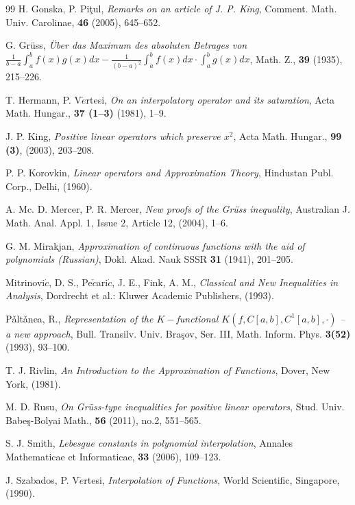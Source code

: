 \documentclass[12pt,leqno,a4paper,dvips,twoside]{article}
\begin{document}
{\begin{thebibliography}{99}
H. Gonska, P. Pi\c{t}ul, {\it Remarks on an article of J. P. King}, Comment. Math. Univ. Carolinae, \textbf{46} (2005), 645--652. 

G. Gr{\"u}ss, {\it {\"U}ber das Maximum des absoluten Betrages von $\frac{1}{b-a}\int^b_a{f(x)g(x)dx}-\frac{1}{(b-a)^2}\int^b_a{f(x)dx}\cdot\int^b_a{g(x)dx}$}, Math. Z., \textbf{39} (1935), 215--226.

T. Hermann, P. V$\acute{e}$rtesi, {\it On an interpolatory operator and its saturation}, Acta 
Math. Hungar., \textbf{37 (1--3)} (1981), 1--9.

J. P. King, {\it Positive linear operators which preserve $x^2$}, Acta Math. Hungar., \textbf{99 (3)}, (2003), 203--208. 

P. P. Korovkin, {\it Linear operators and Approximation Theory}, Hindustan Publ. Corp., Delhi, (1960).

A. Mc. D. Mercer, P. R. Mercer, {\it New proofs of the Gr\"{u}ss inequality}, Australian J. Math. Anal. Appl. 1, Issue 2, Article 12, (2004), 1--6.

G. M. Mirakjan, {\it Approximation of continuous functions with the aid of polynomials (Russian)}, Dokl. Akad. Nauk SSSR \textbf{31} (1941), 201--205.

Mitrinovi$\acute{c}$, D. S., Pe$\check{c}$ari$\acute{c}$, J. E., Fink, A. M., {\it Classical and New Inequalities in Analysis}, Dordrecht et al.: Kluwer Academic Publishers, (1993). 

P\v{a}lt\v{a}nea, R., {\it Representation of the $K-$functional $K(f,C[a,b],C^1[a,b],\cdot)$ -- a new approach}, Bull. Transilv. Univ. Bra\c{s}ov, Ser. III, Math. Inform. Phys. \textbf{3(52)} (1993), 93--100. 

T. J. Rivlin, {\it An Introduction to the Approximation of Functions}, Dover, New York, (1981).

M. D. Rusu, {\it On Gr\"{u}ss-type inequalities for positive linear operators}, Stud. Univ. Babe\c{s}-Bolyai Math., \textbf{56} (2011), no.2, 551--565.

S. J. Smith, {\it Lebesgue constants in polynomial interpolation}, Annales Mathematicae et Informaticae,
\textbf{33} (2006), 109--123.

J. Szabados, P. V$\acute{e}$rtesi, {\it Interpolation of Functions}, World Scientific, Singapore, (1990).


\end{thebibliography}}
\end{document}
